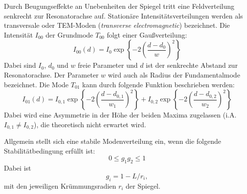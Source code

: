 Durch Beugungseffekte an Unebenheiten der Spiegel tritt eine Feldverteilung senkrecht zur Resonatorachse auf. Stationäre Intensitätsverteilungen
werden als transversale oder TEM-Moden (\textit{transverse electromagnetic}) bezeichnet. Die Intensität $I_{00}$ der Grundmode $T_{00}$ folgt einer Gaußverteilung:
\begin{equation}
	  I_{00}(d) = I_{0}\exp\left\{- 2\left(\frac{d-d_0}{w}\right)^2\right\}
	    \label{eq: tem00}
\end{equation}
Dabei sind $I_{0}$, $d_0$ und $w$ freie Parameter und $d$ ist der senkrechte Abstand zur
Resonatorachse. Der Parameter $w$ wird auch als Radius
der Fundamentalmode bezeichnet. Die Mode $T_{01}$ kann durch folgende Funktion beschrieben
werden:
\begin{equation} %
	  I_{01}(d) = I_{0, 1}\exp\left\{- 2\left(\frac{d-d_{0, 1}}{w_{1}}\right)^2\right\} + I_{0, 2}\exp\left\{- 2\left(\frac{d-d_{0,2}}{w_{2}}\right)^2\right\}
	    \label{eq:tem01}
\end{equation}
Dabei wird eine Asymmetrie in der Höhe der beiden Maxima zugelassen (i.A. $I_{0, 1} \neq I_{0, 2}$), die theoretisch nicht
erwartet wird.

Allgemein stellt sich eine stabile Modenverteilung
ein, wenn die folgende Stabilitätbedingung erfüllt ist:
\begin{equation}
	  0 \leq g_1 g_2 \leq 1
	    \label{eq:stabilität}
\end{equation}
Dabei ist
\begin{equation}
	  g_{i} = 1 - L/r_{i},
	    \label{eq:spiegelparameter}
\end{equation}
mit den jeweiligen Krümmungsradien $r_{i}$ der Spiegel.

